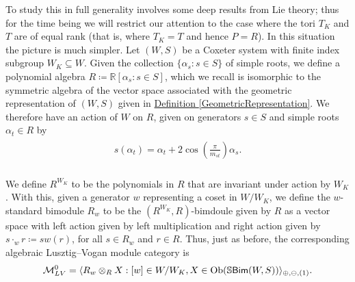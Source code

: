 \noindent To study this in full generality involves some deep results from Lie theory; thus for the time being we will restrict our attention to the case where the tori $T_K$ and $T$ are of equal rank (that is, where $T_K = T$ and hence $P = R$). In this situation the picture is much simpler. Let $(W, S)$ be a Coxeter system with finite index subgroup $W_K \subseteq W$. Given the collection $\{\alpha_s : s \in S\}$ of simple roots, we define a polynomial algebra $R \coloneqq \mathbb{R}[\alpha_s : s \in S]$, which we recall is isomorphic to the symmetric algebra of the vector space associated with the geometric representation of $(W, S)$ given in \hyperref[GeometricRepresentation]{Definition \ref*{GeometricRepresentation}}. We therefore have an action of $W$ on $R$, given on generators $s \in S$ and simple roots $\alpha_t \in R$ by\\[-\linespacing]
\begin{align*}
\begin{split}
s(\alpha_t) = \alpha_t + 2\cos\!\left(\frac{\pi}{m_{st}}\right)\!\alpha_s.
\end{split}
\end{align*}
\noindent\\[-0.6\linespacing] We define $R^{W_K}$ to be the polynomials in $R$ that are invariant under action by $W_K$. With this, given a generator $w$ representing a coset in $W/W_K$, we define the $w$-standard bimodule $R_w$ to be the $(R^{W_K}, R)$-bimdoule given by $R$ as a vector space with left action given by left multiplication and right action given by $s \cdot_w r \coloneqq s w(r)$, for all $s \in R_w$ and $r \in R$. Thus, just as before, the corresponding algebraic Lusztig--Vogan module category is
\begin{align*}
\begin{split}
\mathcal{M}_{LV}^0 = \langle R_w \otimes_R X : [w] \in W/W_K, X \in \textnormal{Ob}(\mathbb{S}\textnormal{\textsf{Bim}}(W, S))\rangle_{\oplus,\ominus,(1)}.
\end{split}
\end{align*}
\newpage

